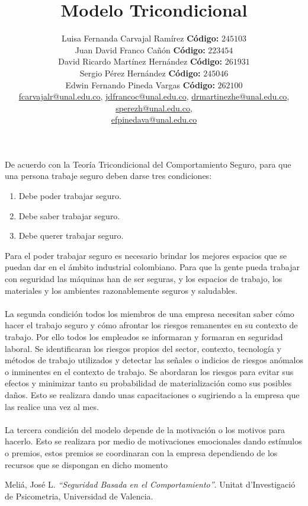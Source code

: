 \documentclass[11pt,graphicx,caption,rotating]{article}
\begin{document}
\title{{\huge \bf Modelo Tricondicional}}
\author{Luisa Fernanda Carvajal Ramírez \textbf{Código:} $245103$\\
	Juan David Franco Cañón \textbf{Código:} $223454$\\
	David Ricardo Martínez Hernández \textbf{Código:} $261931$\\
	Sergio Pérez Hernández \textbf{Código:} $245046$\\
	Edwin Fernando Pineda Vargas \textbf{Código:} $262100$\\
	\href{}{fcarvajalr@unal.edu.co}, \href{}{jdfrancoc@unal.edu.co}, \href{}{drmartinezhe@unal.edu.co}, \href{}{sperezh@unal.edu.co},\\ \href{}{efpinedava@unal.edu.co}}	
\date{}
\maketitle
\noindent
De acuerdo con la Teoría Tricondicional del Comportamiento Seguro, para que una persona trabaje seguro deben darse tres condiciones:
\begin{enumerate}
 \item Debe poder trabajar seguro.
 \item Debe saber trabajar seguro.
 \item Debe querer trabajar seguro.
\end{enumerate}
\noindent
Para el poder trabajar seguro es necesario brindar los mejores espacios que se puedan dar en el ámbito industrial colombiano. Para que la gente pueda trabajar con seguridad las máquinas han de ser seguras, y los espacios de trabajo, los materiales y los ambientes razonablemente seguros y saludables.\\\\
La segunda condición todos los miembros de una empresa necesitan saber cómo hacer el trabajo seguro y cómo afrontar los riesgos remanentes en su contexto de trabajo. Por ello todos los empleados se informaran y formaran en seguridad laboral. Se identificaran los riesgos propios del sector, contexto, tecnología y métodos de trabajo utilizados y detectar las señales o indicios de riesgos anómalos o inminentes en el contexto de trabajo. Se abordaran los riesgos para evitar sus efectos y minimizar tanto su probabilidad de materialización como sus posibles daños. Esto se realizara dando unas capacitaciones o sugiriendo a la empresa que las realice una vez al mes.\\\\
La tercera condición del modelo depende de la motivación o los motivos para hacerlo. Esto se realizara por medio de motivaciones emocionales dando estímulos o premios, estos premios se coordinaran con la empresa dependiendo de los recursos que se dispongan en dicho momento 

\begin{thebibliography}{99}

  Meliá, José L.
 {\em "`Seguridad Basada en el Comportamiento"'}.
 Unitat d’Investigació de Psicometria, Universidad de Valencia.

\end{thebibliography}
\end{document}
